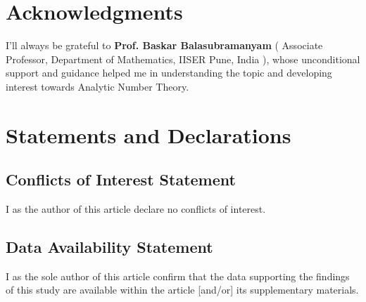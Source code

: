 \documentclass[article,12pt]{elsarticle}
\begin{document}
	
	
	\vspace{80pt}
	\section*{Acknowledgments}
I'll always be grateful to \textbf{Prof. Baskar Balasubramanyam} ( Associate Professor, Department of Mathematics, IISER Pune, India ), whose unconditional support and guidance helped me in understanding the topic and developing interest towards Analytic Number Theory.
	\section*{Statements and Declarations}
	\subsection*{Conflicts of Interest Statement}
	I as the author of this article declare no conflicts of interest.
	\subsection*{Data Availability Statement}
	I as the sole author of this article confirm that the data supporting the findings of this study are available within the article [and/or] its supplementary materials.
		
		
	
		
\end{document}
